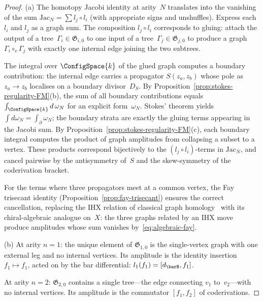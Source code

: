 \begin{proof}
(a)\enspace
The homotopy Jacobi identity at arity~$N$ translates into the
vanishing of the sum
$\mathrm{Jac}_N = \sum l_j \circ l_i$
(with appropriate signs and unshuffles).
Express each $l_i$ and $l_j$ as a graph sum.  The composition
$l_j \circ l_i$ corresponds to gluing: attach the output of a
tree~$\Gamma_i \in \mathfrak{G}_{i,0}$ to one input of a
tree~$\Gamma_j \in \mathfrak{G}_{j,0}$ to produce a graph
$\Gamma_i \circ_v \Gamma_j$ with exactly one internal edge
joining the two subtrees.

The integral over $\ConfigSpace{k}$ of the
glued graph computes a boundary contribution: the internal edge
carries a propagator $S(z_a, z_b)$ whose pole as
$z_a \to z_b$ localises on a boundary divisor~$D_S$.
By Proposition~\ref{prop:stokes-regularity-FM}(b), the sum of
all boundary contributions equals
$\int_{\ConfigSpace{k}} d\,\omega_N$ for an explicit
form~$\omega_N$.  Stokes' theorem yields
$\int d\omega_N = \int_\partial \omega_N$; the boundary strata
are exactly the gluing terms appearing in the Jacobi sum.
By Proposition~\ref{prop:stokes-regularity-FM}(c), each boundary
integral computes the product of graph amplitudes from collapsing
a subset to a vertex.  These products correspond bijectively to the
$(l_j \circ l_i)$-terms in $\mathrm{Jac}_N$, and cancel pairwise
by the antisymmetry of~$S$ and the skew-symmetry of the coderivation
bracket.

For the terms where three propagators meet at a common vertex, the
Fay trisecant identity
(Proposition~\ref{prop:fay-trisecant}) ensures the correct
cancellation, replacing the IHX relation of classical graph
homology~\cite{LV12} with its chiral-algebraic analogue on~$X$:
the three graphs related by an IHX move produce amplitudes whose sum
vanishes by~\eqref{eq:algebraic-fay}.

(b)\enspace
At arity $n = 1$: the unique element of $\mathfrak{G}_{1,0}$ is the
single-vertex graph with one external leg and no internal vertices.
Its amplitude is the identity insertion $f_1 \mapsto f_1$, acted on
by the bar differential: $l_1(f_1) = [d_{\barB}, f_1]$.

At arity $n = 2$: $\mathfrak{G}_{2,0}$ contains a single tree---the
edge connecting $v_1$ to~$v_2$---with no internal vertices.  Its
amplitude is the commutator $[f_1, f_2]$ of coderivations.


\end{proof}
